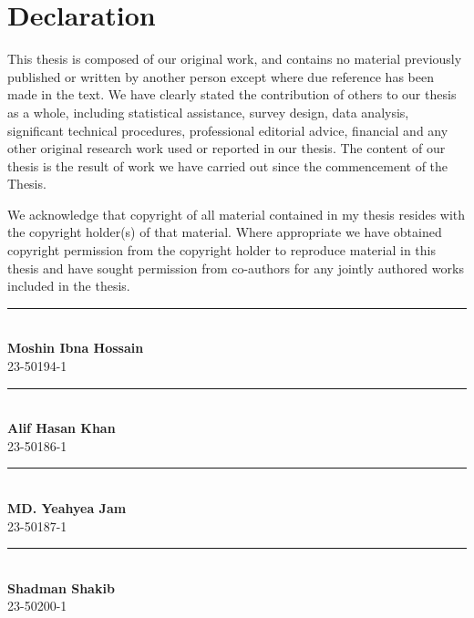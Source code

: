 \chapter*{Declaration}

This thesis is composed of our original work, and contains no material
previously published or written by another person except where due reference
has been made in the text. We have clearly stated the contribution of others to
our thesis as a whole, including statistical assistance, survey design, data
analysis, significant technical procedures, professional editorial advice,
financial and any other original research work used or reported in our thesis.
The content of our thesis is the result of work we have carried out since the
commencement of the Thesis.

We acknowledge that copyright of all material contained in my thesis resides
with the copyright holder(s) of that material. Where appropriate we have
obtained copyright permission from the copyright holder to reproduce material
in this thesis and have sought permission from co-authors for any jointly
authored works included in the thesis.

\vspace{1.6cm}

\noindent
\begin{minipage}[t]{0.48\textwidth}
\rule{5.5cm}{0.4pt}\\
\textbf{Moshin Ibna Hossain}\\
23-50194-1\\
\department
\end{minipage}%
\hfill
\begin{minipage}[t]{0.48\textwidth}
\rule{5.5cm}{0.4pt}\\
\textbf{Alif Hasan Khan}\\
23-50186-1\\
\department
\end{minipage}

\vspace{1.8cm}

\noindent
\begin{minipage}[t]{0.48\textwidth}
\rule{5.5cm}{0.4pt}\\
\textbf{MD. Yeahyea Jam}\\
23-50187-1\\
\department
\end{minipage}%
\hfill
\begin{minipage}[t]{0.48\textwidth}
\rule{5.5cm}{0.4pt}\\
\textbf{Shadman Shakib}\\
23-50200-1\\
\department
\end{minipage}

\clearpage

